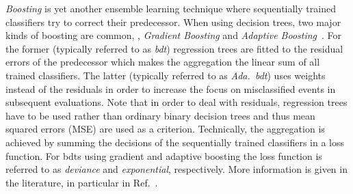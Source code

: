 \textit{Boosting} is yet another ensemble learning technique where sequentially trained classifiers try to correct their predecessor.
When using decision trees, two major kinds of boosting are common, \ie{}, \textit{Gradient Boosting} and \textit{Adaptive Boosting}~\cite{gboosting,adaboosting}.
For the former (typically referred to as \textit{\gls{bdt}}) regression trees are fitted to the residual errors of the predecessor which makes the aggregation the linear sum of all trained classifiers.
The latter (typically referred to as \textit{Ada.~\gls{bdt}}) uses weights instead of the residuals in order to increase the focus on misclassified events in subsequent evaluations.
Note that in order to deal with residuals, regression trees have to be used rather than ordinary binary decision trees and thus mean squared errors (MSE) are used as a criterion.
Technically, the aggregation is achieved by summing the decisions of the sequentially trained classifiers in a loss function.
For \glspl{bdt} using gradient and adaptive boosting the loss function is referred to as \textit{deviance} and \textit{exponential}, respectively.
More information is given in the literature, in particular in Ref.~\cite{handsonml}.

